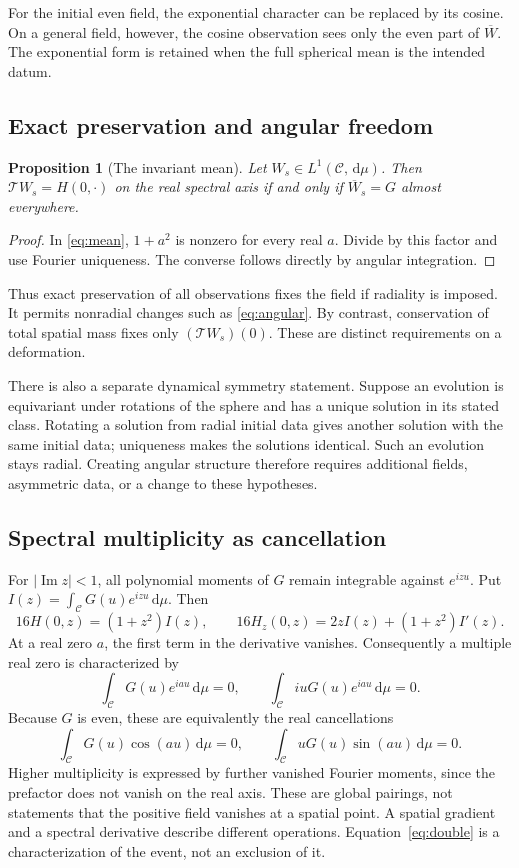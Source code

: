 \documentclass[11pt]{article}
\newtheorem{proposition}{Proposition}[section]
\theoremstyle{remark}
\numberwithin{equation}{section}
\newcommand{\cC}{\mathcal C}
\newcommand{\dd}{\,\mathrm d}
\begin{document}
For the initial even field, the exponential character can be replaced
by its cosine. On a general field, however, the cosine observation sees
only the even part of \(\overline W\). The exponential form is retained
when the full spherical mean is the intended datum.

\subsection{Exact preservation and angular freedom}

\begin{proposition}[The invariant mean]\label{prop:invariant}
Let \(W_s\in L^1(\cC,\dd\mu)\). Then
\(\mathcal TW_s=H(0,\cdot)\) on the real spectral axis if and only if
\(\overline W_s=G\) almost everywhere.
\end{proposition}
\begin{proof}
In \eqref{eq:mean}, \(1+a^2\) is nonzero for every real \(a\).
Divide by this factor and use Fourier uniqueness. The converse follows
directly by angular integration.
\end{proof}

Thus exact preservation of all observations fixes the field if radiality
is imposed. It permits nonradial changes such as \eqref{eq:angular}.
By contrast, conservation of total spatial mass fixes only
\((\mathcal TW_s)(0)\). These are distinct requirements on a deformation.

There is also a separate dynamical symmetry statement. Suppose an
evolution is equivariant under rotations of the sphere and has a unique
solution in its stated class. Rotating a solution from radial initial
data gives another solution with the same initial data; uniqueness makes
the solutions identical. Such an evolution stays radial. Creating
angular structure therefore requires additional fields, asymmetric data,
or a change to these hypotheses.

\subsection{Spectral multiplicity as cancellation}

For \(|\operatorname{Im}z|<1\), all polynomial moments of \(G\)
remain integrable against \(e^{izu}\). Put
\(I(z)=\int_{\cC}G(u)e^{izu}\dd\mu\). Then
\[
 16H(0,z)=(1+z^2)I(z),\qquad
 16H_z(0,z)=2zI(z)+(1+z^2)I'(z).
\]
At a real zero \(a\), the first term in the derivative vanishes.
Consequently a multiple real zero is characterized by
\begin{equation}\label{eq:double}
 \int_{\cC}G(u)e^{iau}\dd\mu=0,\qquad
 \int_{\cC}iuG(u)e^{iau}\dd\mu=0.
\end{equation}
Because \(G\) is even, these are equivalently the real cancellations
\[
 \int_{\cC}G(u)\cos(au)\dd\mu=0,\qquad
 \int_{\cC}uG(u)\sin(au)\dd\mu=0.
\]
Higher multiplicity is expressed by further vanished Fourier moments,
since the prefactor does not vanish on the real axis. These are global
pairings, not statements that the positive field vanishes at a spatial
point. A spatial gradient and a spectral derivative describe different
operations. Equation~\eqref{eq:double} is a characterization of the
event, not an exclusion of it.
\end{document}
